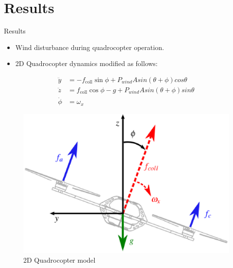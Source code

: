 \documentclass[handout]{beamer}
\begin{document}
\section{Results}
%
\begin{frame}{Results}
\begin{itemize}
\item Wind disturbance during quadrocopter operation. \pause
\item 2D Quadrocopter dynamics modified as follows: \pause
\end{itemize}
\begin{equation}
\begin{aligned}
\ddot{y} &= -f_{\mathrm{coll}} \sin\phi + P_{wind} A sin(\theta + \phi) cos \theta \\
\ddot{z} &=  f_{\mathrm{coll}}\cos\phi - g + P_{wind} A sin(\theta + \phi) sin \theta \\
\dot{\phi} &= \omega_{x}
\end{aligned}
\end{equation}
\begin{figure}
\center
\includegraphics[scale=0.25]{quadrocopter}			
\caption{2D Quadrocopter model}
\end{figure}
\end{frame}
%
\end{document}
